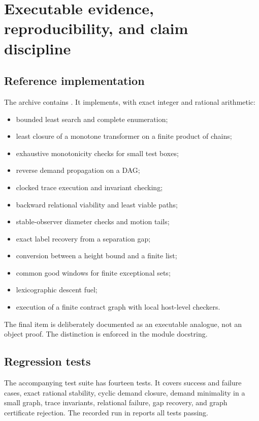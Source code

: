 \section{Executable evidence, reproducibility, and claim discipline}

\subsection{Reference implementation}

The archive contains .  It implements,
with exact integer and rational arithmetic:

\begin{itemize}
\item bounded least search and complete enumeration;
\item least closure of a monotone transformer on a finite product of chains;
\item exhaustive monotonicity checks for small test boxes;
\item reverse demand propagation on a DAG;
\item clocked trace execution and invariant checking;
\item backward relational viability and least viable paths;
\item stable-observer diameter checks and motion tails;
\item exact label recovery from a separation gap;
\item conversion between a height bound and a finite list;
\item common good windows for finite exceptional sets;
\item lexicographic descent fuel;
\item execution of a finite contract graph with local host-level checkers.
\end{itemize}

The final item is deliberately documented as an executable analogue, not an
object proof.  The distinction is enforced in the module docstring.

\subsection{Regression tests}

The accompanying test suite has fourteen tests.  It covers success and failure
cases, exact rational stability, cyclic demand closure, demand minimality in a
small graph, trace invariants, relational failure, gap recovery, and graph
certificate rejection.  The recorded run in
 reports all tests passing.

